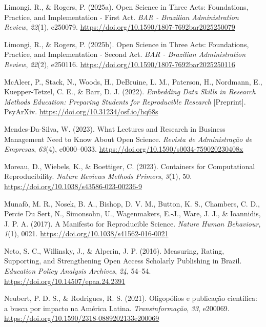 \documentclass[
  a4paper,
]{book}
\newlength{\cslhangindent}
\newenvironment{CSLReferences}[2] %
 {\begin{list}{}{%
  \setlength{\itemindent}{0pt}
  \setlength{\leftmargin}{0pt}
  \setlength{\parsep}{0pt}
  \ifodd #1
   \setlength{\leftmargin}{\cslhangindent}
   \setlength{\itemindent}{-1\cslhangindent}
  \fi
  \setlength{\itemsep}{#2\baselineskip}}}
 {\end{list}}
\begin{document}
\begin{CSLReferences}{1}{0}
Limongi, R., \& Rogers, P. (2025a). Open Science in Three Acts:
Foundations, Practice, and Implementation - First Act. \emph{BAR -
Brazilian Administration Review}, \emph{22}(1), e250079.
\url{https://doi.org/10.1590/1807-7692bar2025250079}

Limongi, R., \& Rogers, P. (2025b). Open Science in Three Acts:
Foundations, Practice, and Implementation - Second Act. \emph{BAR -
Brazilian Administration Review}, \emph{22}(2), e250116.
\url{https://doi.org/10.1590/1807-7692bar2025250116}

McAleer, P., Stack, N., Woods, H., DeBruine, L. M., Paterson, H.,
Nordmann, E., Kuepper-Tetzel, C. E., \& Barr, D. J. (2022).
\emph{Embedding {Data Skills} in {Research Methods Education}:
{Preparing Students} for {Reproducible Research}} {[}Preprint{]}.
PsyArXiv. \url{https://doi.org/10.31234/osf.io/hq68s}

Mendes-Da-Silva, W. (2023). What {Lectures} and {Research} in {Business
Management Need} to {Know About Open Science}. \emph{Revista de
Administra{ç}{ã}o de Empresas}, \emph{63}(4), e0000--0033.
\url{https://doi.org/10.1590/s0034-759020230408x}

Moreau, D., Wiebels, K., \& Boettiger, C. (2023). Containers for
Computational Reproducibility. \emph{Nature Reviews Methods Primers},
\emph{3}(1), 50. \url{https://doi.org/10.1038/s43586-023-00236-9}

Munafò, M. R., Nosek, B. A., Bishop, D. V. M., Button, K. S., Chambers,
C. D., Percie Du Sert, N., Simonsohn, U., Wagenmakers, E.-J., Ware, J.
J., \& Ioannidis, J. P. A. (2017). A Manifesto for Reproducible Science.
\emph{Nature Human Behaviour}, \emph{1}(1), 0021.
\url{https://doi.org/10.1038/s41562-016-0021}

Neto, S. C., Willinsky, J., \& Alperin, J. P. (2016). Measuring, Rating,
Supporting, and Strengthening Open Access Scholarly Publishing in
{Brazil}. \emph{Education Policy Analysis Archives}, \emph{24}, 54--54.
\url{https://doi.org/10.14507/epaa.24.2391}

Neubert, P. D. S., \& Rodrigues, R. S. (2021). Oligopólios e publicação
científica: a busca por impacto na América Latina.
\emph{Transinformação}, \emph{33}, e200069.
\url{https://doi.org/10.1590/2318-0889202133e200069}


\end{CSLReferences}
\end{document}
